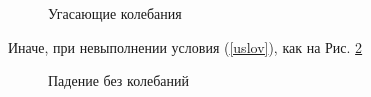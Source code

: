 \documentclass[a4paper,12pt,titlepage]{article}
\theoremstyle{definition}
\theoremstyle{theorem}
\theoremstyle{definition}
\begin{document}
\begin{figure}[h!!!]
    \noindent{}
    \caption{Угасающие колебания}
    \label{b2less4a}
\end{figure}
Иначе, при невыполнении условия (\ref*{uslov}), как на Рис. \ref*{b2larg4a} 
\begin{figure}[h!!!]
    \noindent{}
    \caption{Падение без колебаний}
    \label{b2larg4a}
\end{figure}
\end{document}
